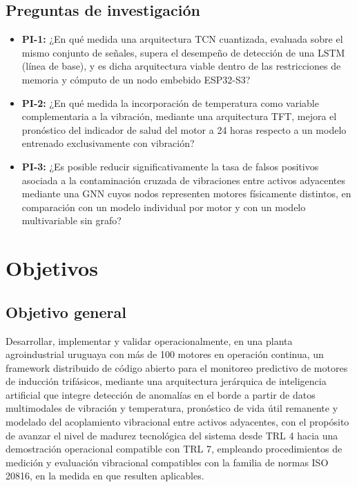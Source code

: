 \documentclass[11pt]{article}
\begin{document}
\subsection{Preguntas de investigación}
\begin{itemize}
    \item[] \textbf{PI-1:} ¿En qué medida una arquitectura TCN cuantizada, evaluada sobre el mismo conjunto de señales, supera el desempeño de detección de una LSTM (línea de base), y es dicha arquitectura viable dentro de las restricciones de memoria y cómputo de un nodo embebido ESP32-S3?
    \item[] \textbf{PI-2:} ¿En qué medida la incorporación de temperatura como variable complementaria a la vibración, mediante una arquitectura TFT, mejora el pronóstico del indicador de salud del motor a 24 horas respecto a un modelo entrenado exclusivamente con vibración?
    \item[] \textbf{PI-3:} ¿Es posible reducir significativamente la tasa de falsos positivos asociada a la contaminación cruzada de vibraciones entre activos adyacentes mediante una GNN cuyos nodos representen motores físicamente distintos, en comparación con un modelo individual por motor y con un modelo multivariable sin grafo?
\end{itemize}

\section{Objetivos}
\label{sec:objetivos}

\subsection{Objetivo general}
Desarrollar, implementar y validar operacionalmente, en una planta agroindustrial uruguaya con más de 100 motores en operación continua, un framework distribuido de código abierto para el monitoreo predictivo de motores de inducción trifásicos, mediante una arquitectura jerárquica de inteligencia artificial que integre detección de anomalías en el borde a partir de datos multimodales de vibración y temperatura, pronóstico de vida útil remanente y modelado del acoplamiento vibracional entre activos adyacentes, con el propósito de avanzar el nivel de madurez tecnológica del sistema desde TRL 4 hacia una demostración operacional compatible con TRL 7, empleando procedimientos de medición y evaluación vibracional compatibles con la familia de normas ISO 20816, en la medida en que resulten aplicables.
\end{document}
